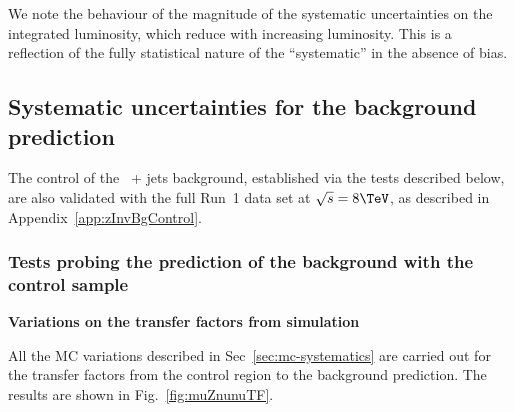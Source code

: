 We note the behaviour of the magnitude of the systematic uncertainties
on the integrated luminosity, which reduce with increasing
luminosity. This is a reflection of the fully statistical nature of
the ``systematic'' in the absence of bias.

\subsection{Systematic uncertainties for the \znunu background
prediction}

The control of the \znunu\ + jets background, established via the
tests described below, are also validated with the full Run~1 data set
at $\sqrt{s} = 8\tev$, as described in
Appendix~\ref{app:zInvBgControl}.

\subsubsection{Tests probing the prediction of the \znunu
background with the \mj control sample}
\label{sec:muZnunu}

{\bf Variations on the transfer factors from simulation}

All the MC variations described in Sec~\ref{sec:mc-systematics} are
carried out for the transfer factors from the \mj control region to
the \znunu background prediction. The results are shown in
Fig.~\ref{fig:muZnunuTF}.

